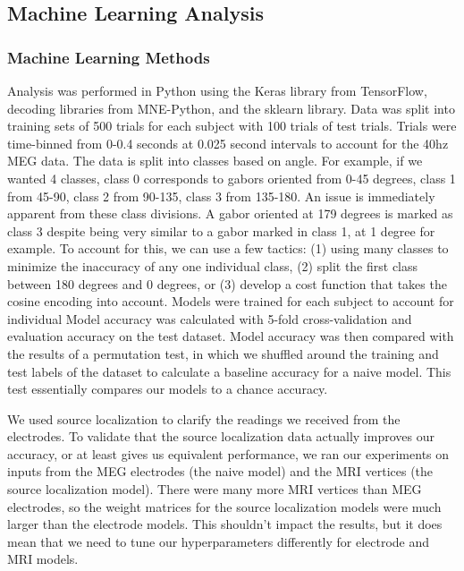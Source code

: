 \documentclass[../main.tex]{subfiles}
\begin{document}
\subsection{Machine Learning Analysis}
\subsubsection{Machine Learning Methods}
Analysis was performed in Python using the Keras library from TensorFlow, decoding libraries from MNE-Python, and the sklearn library. Data was split into training sets of 500 trials for each subject with 100 trials of test trials. Trials were time-binned from 0-0.4 seconds at 0.025 second intervals to account for the 40hz MEG data. The data is split into classes based on angle. For example, if we wanted 4 classes, class 0 corresponds to gabors oriented from 0-45 degrees, class 1 from 45-90, class 2 from 90-135, class 3 from 135-180. An issue is immediately apparent from these class divisions. A gabor oriented at 179 degrees is marked as class 3 despite being very similar to a gabor marked in class 1, at 1 degree for example. To account for this, we can use a few tactics: (1) using many classes to minimize the inaccuracy of any one individual class, (2) split the first class between 180 degrees and 0 degrees, or (3) develop a cost function that takes the cosine encoding into account. Models were trained for each subject to account for individual Model accuracy was calculated with 5-fold cross-validation and evaluation accuracy on the test dataset. Model accuracy was then compared with the results of a permutation test, in which we shuffled around the training and test labels of the dataset to calculate a baseline accuracy for a naive model. This test essentially compares our models to a chance accuracy.

We used source localization to clarify the readings we received from the electrodes. To validate that the source localization data actually improves our accuracy, or at least gives us equivalent performance, we ran our experiments on inputs from the MEG electrodes (the naive model) and the MRI vertices (the source localization model). There were many more MRI vertices than MEG electrodes, so the weight matrices for the source localization models were much larger than the electrode models. This shouldn't impact the results, but it does mean that we need to tune our hyperparameters differently for electrode and MRI models.
\end{document}
